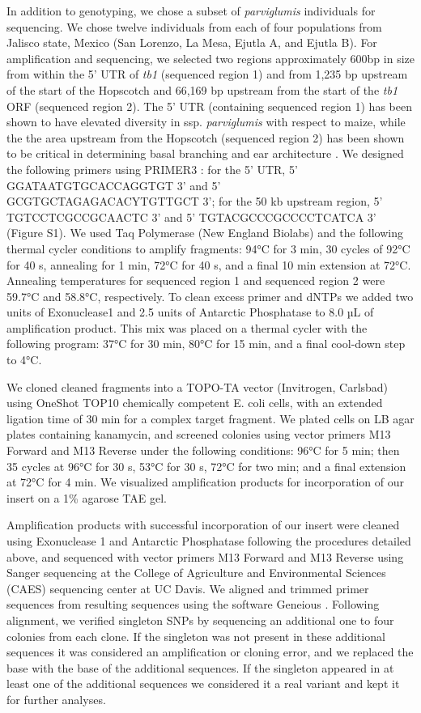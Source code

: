 \documentclass[12pt]{article}
\begin{document}
In addition to genotyping, we chose a subset of \emph{parviglumis} individuals for sequencing. We chose twelve individuals from each of four populations from Jalisco state, Mexico (San Lorenzo, La Mesa, Ejutla A, and Ejutla B). For amplification and sequencing, we selected two regions approximately 600bp in size from within the 5' UTR of \emph{tb1} (sequenced region 1) and from 1,235 bp upstream of the start of the Hopscotch and 66,169 bp upstream from the start of the \emph{tb1} ORF (sequenced region 2). The 5' UTR (containing sequenced region 1) has been shown to have elevated diversity in ssp. \emph{parviglumis} with respect to maize, while the the area upstream from the Hopscotch (sequenced region 2) has been shown to be critical in determining basal branching and ear architecture \cite{Wang et al 1999, Clark et al 2006}. We designed the following primers using PRIMER3 \cite{Rozen and Skaletsky 2000}: for the 5' UTR, 5' GGATAATGTGCACCAGGTGT 3' and 5' GCGTGCTAGAGACACYTGTTGCT 3'; for the 50 kb upstream region, 5' TGTCCTCGCCGCAACTC 3' and 5' TGTACGCCCGCCCCTCATCA 3' (Figure S1). We used Taq Polymerase (New England Biolabs) and the following thermal cycler conditions to amplify fragments: 94°C for 3 min, 30 cycles of 92°C for 40 s, annealing for 1 min, 72°C for 40 s, and a final 10 min extension at 72°C. Annealing temperatures for sequenced region 1 and sequenced region 2 were 59.7°C and 58.8°C, respectively. To clean excess primer and dNTPs we added two units of Exonuclease1 and 2.5 units of Antarctic Phosphatase to 8.0 µL of amplification product. This mix was placed on a thermal cycler with the following program: 37°C for 30 min, 80°C for 15 min, and a final cool-down step to 4°C. 

We cloned cleaned fragments into a TOPO-TA vector (Invitrogen, Carlsbad) using OneShot TOP10 chemically competent E. coli cells, with an extended ligation time of 30 min for a complex target fragment. We plated cells on LB agar plates containing kanamycin, and screened colonies using vector primers M13 Forward and M13 Reverse under the following conditions: 96°C for 5 min; then 35 cycles at 96°C for 30 s, 53°C for 30 s, 72°C for two min; and a final extension at 72°C for 4 min. We visualized amplification products for incorporation of our insert on a 1\% agarose TAE gel.

Amplification products with successful incorporation of our insert were cleaned using Exonuclease 1 and Antarctic Phosphatase following the procedures detailed above, and sequenced with vector primers M13 Forward and M13 Reverse using Sanger sequencing at the College of Agriculture and Environmental Sciences (CAES) sequencing center at UC Davis. We aligned and trimmed primer sequences from resulting sequences using the software Geneious \cite{Kearse et al 2012}. Following alignment, we verified singleton SNPs by sequencing an additional one to four colonies from each clone. If the singleton was not present in these additional sequences it was considered an amplification or cloning error, and we replaced the base with the base of the additional sequences. If the singleton appeared in at least one of the additional sequences we considered it a real variant and kept it for further analyses. 
\end{document}
